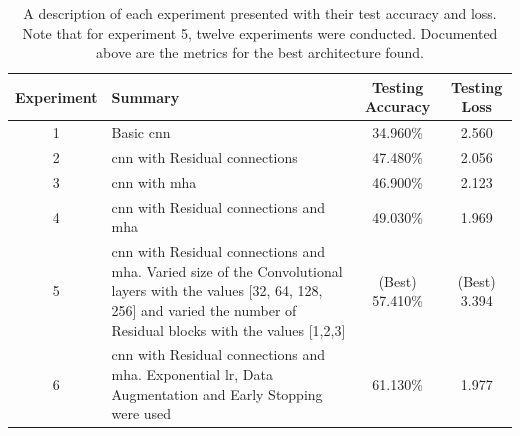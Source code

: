 \documentclass[11pt]{article}
\def\FINALACCURACY{61.130\% }
\def\FINALLOSS{1.977 }
\begin{document}
\begin{table}
\centering
\begin{tabular}{|c|p{80mm}|c|c|} 
 \hline
 Experiment & Summary &  Testing Accuracy & Testing Loss \\ [0.2ex] 
 \hline
 1 & Basic \acrshort{cnn} & 34.960\% & 2.560 \\
 \hline
 2 & \acrshort{cnn} with Residual connections & 47.480\% & 2.056 \\
 \hline
 3 & \acrshort{cnn} with \acrshort{mha} & 46.900\% & 2.123 \\
 \hline
 4 & \acrshort{cnn} with Residual connections and \acrshort{mha} & 49.030\% & 1.969 \\
 \hline
 5 & \acrshort{cnn} with Residual connections and \acrshort{mha}. Varied size of the Convolutional layers with the values [32, 64, 128, 256] and varied the number of Residual blocks with the values [1,2,3] & (Best) 57.410\% & (Best) 3.394 \\
 \hline
 6 & \acrshort{cnn} with Residual connections and \acrshort{mha}. Exponential \acrshort{lr}, Data Augmentation and Early Stopping were used &  \FINALACCURACY & \FINALLOSS \\
 \hline
\end{tabular}
\caption{A description of each experiment presented with their test accuracy and loss. Note that for experiment 5, twelve experiments were conducted. Documented above are the metrics for the best architecture found.}
\label{table: All Experiments}
\end{table}
\end{document}
